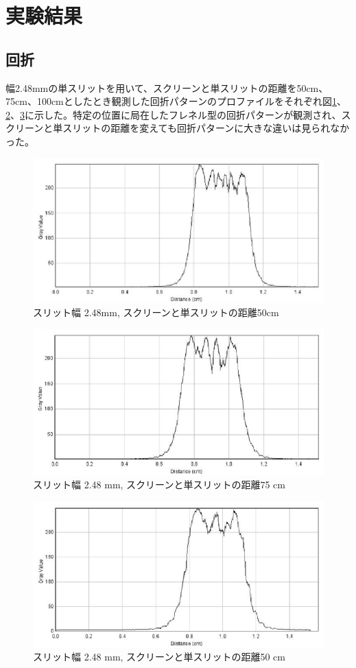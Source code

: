 \documentclass[11pt,a4]{jarticle}
\begin{document}
\section{実験結果}
\subsection{回折}
幅2.48mmの単スリットを用いて、スクリーンと単スリットの距離を50cm、75cm、100cmとしたとき観測した回折パターンのプロファイルをそれぞれ図\ref{fig:2480um_50cm}、\ref{fig:2480um_75cm}、\ref{fig:2480um_100cm}に示した。特定の位置に局在したフレネル型の回折パターンが観測され、スクリーンと単スリットの距離を変えても回折パターンに大きな違いは見られなかった。
\begin{figure}[htbp]
   \begin{center}
    \includegraphics[width=0.5\hsize]{./2480um_50cm_profile.eps}
    \caption{スリット幅 2.48mm, スクリーンと単スリットの距離50cm }
     \label{fig:2480um_50cm}
   \end{center}
\end{figure}\begin{figure}[htbp]
   \begin{center}
    \includegraphics[width=0.5\hsize]{./2480um_75cm_profile.eps}
    \caption{スリット幅 2.48 mm, スクリーンと単スリットの距離75 cm}
     \label{fig:2480um_75cm}
   \end{center}
\end{figure}
\begin{figure}[htbp]
   \begin{center}
    \includegraphics[width=0.5\hsize]{./2480um_100cm_profile.eps}
    \caption{スリット幅 2.48 mm, スクリーンと単スリットの距離50 cm}
     \label{fig:2480um_100cm}
   \end{center}
\end{figure}
\end{document}
